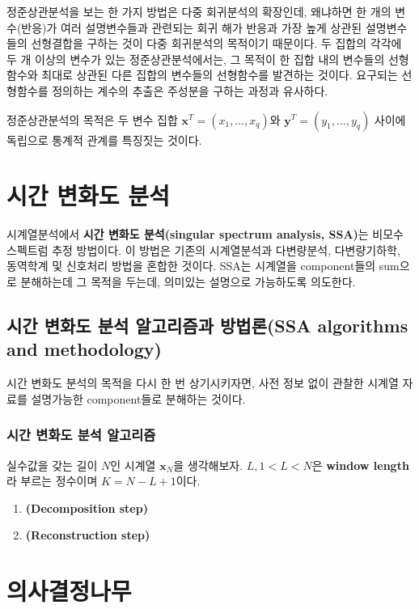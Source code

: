 \documentclass[b5paper,]{scrbook}
\theoremstyle{plain}
\theoremstyle{definition}
\numberwithin{equation}{section}
\begin{document}
정준상관분석을 보는 한 가지 방법은 다중 회귀분석의 확장인데, 왜냐하면 한
개의 변수(반응)가 여러 설명변수들과 관련되는 회귀 해가 반응과 가장 높게
상관된 설명변수들의 선형결합을 구하는 것이 다중 회귀분석의 목적이기
때문이다. 두 집합의 각각에 두 개 이상의 변수가 있는 정준상관분석에서는,
그 목적이 한 집합 내의 변수들의 선형함수와 최대로 상관된 다른 집합의
변수들의 선형함수를 발견하는 것이다. 요구되는 선형함수를 정의하는 계수의
추출은 주성분을 구하는 과정과 유사하다.

정준상관분석의 목적은 두 변수 집합
\(\mathbf{x}^{T}=(x_{1},\ldots, x_{q})\)와
\(\mathbf{y}^{T}=(y_{1},\ldots, y_{q})\) 사이에 독립으로 통계적 관계를
특징짓는 것이다.

\chapter{시간 변화도 분석}\label{SSA}

시계열분석에서 \textbf{시간 변화도 분석(singular spectrum analysis,
SSA)}는 비모수 스펙트럼 추정 방법이다. 이 방법은 기존의 시계열분석과
다변량분석, 다변량기하학, 동역학계 및 신호처리 방법을 혼합한 것이다.
SSA는 시계열을 component들의 sum으로 분해하는데 그 목적을 두는데,
의미있는 설명으로 가능하도록 의도한다.

\section{시간 변화도 분석 알고리즘과 방법론(SSA algorithms and
methodology)}\label{----ssa-algorithms-and-methodology}

시간 변화도 분석의 목적을 다시 한 번 상기시키자면, 사전 정보 없이 관찰한
시계열 자료를 설명가능한 component들로 분해하는 것이다.

\subsection{시간 변화도 분석 알고리즘}\label{---}

실수값을 갖는 길이 \(N\)인 시계열 \(\mathbf{x}_{N}\)을 생각해보자.
\(L, 1<L<N\)은 \textbf{window length}라 부르는 정수이며 \(K=N-L+1\)이다.

\begin{enumerate}
\def\labelenumi{\arabic{enumi}.}
\item
  \textbf{(Decomposition step)}
\item
  \textbf{(Reconstruction step)}
\end{enumerate}

\chapter{의사결정나무}\label{trees}
\end{document}
